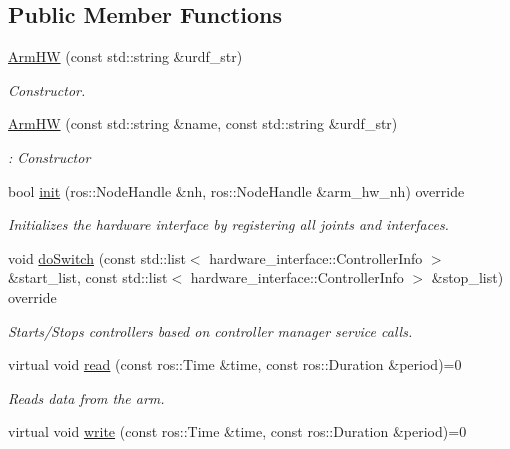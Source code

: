 \subsection*{Public Member Functions}
\begin{DoxyCompactItemize}
\item 
\hyperlink{classuwrt_1_1arm_1_1_arm_h_w_a715621a4a3f913beac7d6e4f16b40c11}{Arm\+HW} (const std\+::string \&urdf\+\_\+str)
\begin{DoxyCompactList}\small\item\em Constructor. \end{DoxyCompactList}\item 
\hyperlink{classuwrt_1_1arm_1_1_arm_h_w_a03495dca1c1616fb09184541713f0670}{Arm\+HW} (const std\+::string \&name, const std\+::string \&urdf\+\_\+str)
\begin{DoxyCompactList}\small\item\em \+: Constructor \end{DoxyCompactList}\item 
bool \hyperlink{classuwrt_1_1arm_1_1_arm_h_w_a2b8c89b8498c70d8b627fefd17267e40}{init} (ros\+::\+Node\+Handle \&nh, ros\+::\+Node\+Handle \&arm\+\_\+hw\+\_\+nh) override
\begin{DoxyCompactList}\small\item\em Initializes the hardware interface by registering all joints and interfaces. \end{DoxyCompactList}\item 
void \hyperlink{classuwrt_1_1arm_1_1_arm_h_w_ae5bbb33ef19c7e27fa0e3888fda5b372}{do\+Switch} (const std\+::list$<$ hardware\+\_\+interface\+::\+Controller\+Info $>$ \&start\+\_\+list, const std\+::list$<$ hardware\+\_\+interface\+::\+Controller\+Info $>$ \&stop\+\_\+list) override
\begin{DoxyCompactList}\small\item\em Starts/\+Stops controllers based on controller manager service calls. \end{DoxyCompactList}\item 
virtual void \hyperlink{classuwrt_1_1arm_1_1_arm_h_w_af2164103badfa99373f787b8a3cecb6b}{read} (const ros\+::\+Time \&time, const ros\+::\+Duration \&period)=0
\begin{DoxyCompactList}\small\item\em Reads data from the arm. \end{DoxyCompactList}\item 
virtual void \hyperlink{classuwrt_1_1arm_1_1_arm_h_w_a934119487836109e24d9054f10e9832f}{write} (const ros\+::\+Time \&time, const ros\+::\+Duration \&period)=0

\end{DoxyCompactItemize}
